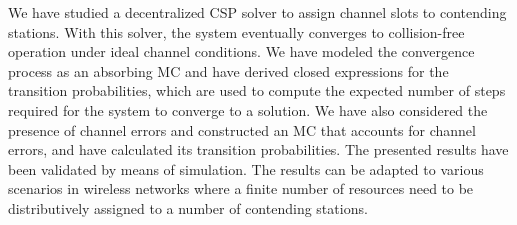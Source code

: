 \documentclass[journal]{IEEEtran}
\begin{document}
We have studied a decentralized CSP solver to assign channel slots to contending stations. With this solver, the system eventually converges to collision-free operation under ideal channel conditions. We have modeled the convergence process as an absorbing MC and have derived closed expressions for the transition probabilities, which are used to compute the expected number of steps required for the system to converge to a solution. We have also considered the presence of channel errors and constructed an MC that accounts for channel errors, and have calculated its transition probabilities. 
The presented results have been validated by means of simulation. The results can be adapted to various scenarios in wireless networks where a finite number of resources need to be distributively assigned to a number of contending stations.






%
\end{document}
